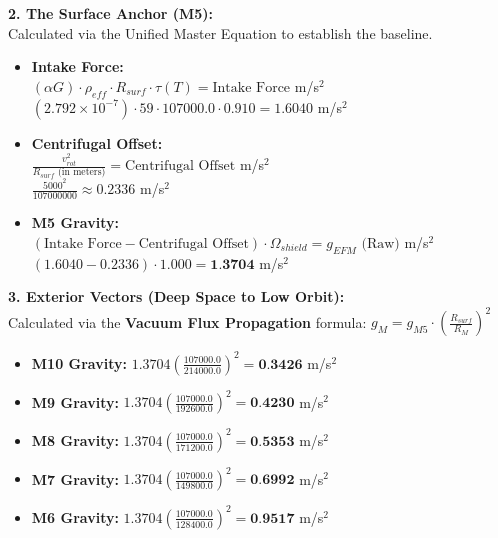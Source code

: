 \documentclass[11pt, a4paper]{article}
\begin{document}
  \vspace{1.0em}
  \noindent \textbf{2. The Surface Anchor (M5):} \\
  \hspace*{1em} Calculated via the Unified Master Equation to establish the baseline.
  \begin{itemize}
    \item \textbf{Intake Force:} \\[0.5em]
    \hspace*{2em} $(\alpha G) \cdot \rho_{eff} \cdot R_{surf} \cdot \tau(T) = \text{Intake Force}$ m/s$^2$ \\[1em]
    \hspace*{2em} $(2.792 \times 10^{-7}) \cdot 59 \cdot 107000.0 \cdot 0.910 = 1.6040$ m/s$^2$
    
    \item \textbf{Centrifugal Offset:} \\[0.5em]
    \hspace*{2em} $\frac{v_{rot}^2}{R_{surf} \text{ (in meters)}} = \text{Centrifugal Offset}$ m/s$^2$ \\[1em]
    \hspace*{2em} $\frac{5000^2}{107000000} \approx 0.2336$ m/s$^2$
    
    \item \textbf{M5 Gravity:} \\[0.5em]
    \hspace*{2em} $(\text{Intake Force} - \text{Centrifugal Offset}) \cdot \Omega_{shield} = g_{EFM} \text{ (Raw)}$ m/s$^2$ \\[1em]
    \hspace*{2em} $(1.6040 - 0.2336) \cdot 1.000 = \textbf{1.3704}$ m/s$^2$
  \end{itemize}

  \clearpage
  \noindent \textbf{3. Exterior Vectors (Deep Space to Low Orbit):} \\
  \hspace*{1em} Calculated via the \textbf{Vacuum Flux Propagation} formula: $g_M = g_{M5} \cdot \left( \frac{R_{surf}}{R_M} \right)^2$
  \begin{itemize}
    \item \textbf{M10 Gravity:} $1.3704 \left( \frac{107000.0}{214000.0} \right)^2 = \textbf{0.3426}$ m/s$^2$
    \item \textbf{M9 Gravity:} $1.3704 \left( \frac{107000.0}{192600.0} \right)^2 = \textbf{0.4230}$ m/s$^2$
    \item \textbf{M8 Gravity:} $1.3704 \left( \frac{107000.0}{171200.0} \right)^2 = \textbf{0.5353}$ m/s$^2$
    \item \textbf{M7 Gravity:} $1.3704 \left( \frac{107000.0}{149800.0} \right)^2 = \textbf{0.6992}$ m/s$^2$
    \item \textbf{M6 Gravity:} $1.3704 \left( \frac{107000.0}{128400.0} \right)^2 = \textbf{0.9517}$ m/s$^2$
  \end{itemize}
\end{document}
